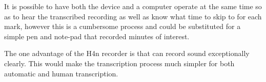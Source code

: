 \documentclass{article}
\begin{document}
    It is possible to have both  the device and a computer operate at the same time so as to hear the transcribed recording as well as know what time to skip to for each mark, however this is a cumbersome process and could be substituted for a simple pen and note-pad that recorded minutes of interest.
    
    The one advantage of the H4n recorder is that can record sound exceptionally clearly. This would make the transcription process much simpler for both automatic and human transcription.
\end{document}
